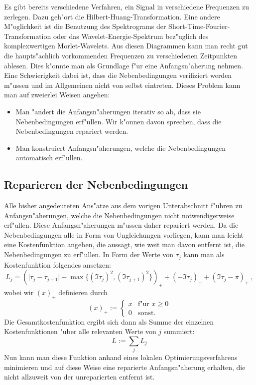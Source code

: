\documentclass[a4paper]{scrartcl}
\begin{document}
Es gibt bereits verschiedene Verfahren, ein Signal in verschiedene Frequenzen zu zerlegen. 
Dazu geh"ort die Hilbert-Huang-Transformation. 
Eine andere M"oglichkeit ist die Benutzung des Spektrograms der Short-Time-Fourier-Transformation oder das Wavelet-Energie-Spektrum bez"uglich des komplexwertigen Morlet-Wavelets. 
Aus diesen Diagrammen kann man recht gut die haupts"achlich vorkommenden Frequenzen zu verschiedenen Zeitpunkten ablesen. 
Dies k"onnte man als Grundlage f"ur eine Anfangsn"aherung nehmen. 
Eine Schwierigkeit dabei ist, dass die Nebenbedingungen verifiziert werden m"ussen und im Allgemeinen nicht von selbst eintreten. 
Dieses Problem kann man auf zweierlei Weisen angehen:
\begin{itemize}
  \item Man "andert die Anfangsn"aherungen iterativ so ab, dass sie Nebenbedingungen erf"ullen. 
  Wir k"onnen davon sprechen, dass die Nebenbedingungen repariert werden. 
  \item Man konstruiert Anfangsn"aherungen, welche die Nebenbedingungen automatisch erf"ullen. 
\end{itemize}


\subsection{Reparieren der Nebenbedingungen}

Alle bisher angedeuteten Ans"atze aus dem vorigen Unterabschnitt f"uhren zu Anfangsn"aherungen, welche die Nebenbedingungen nicht notwendigerweise erf"ullen. 
Diese An\-fangs\-n"a\-he\-rungen m"ussen daher repariert werden. 
Da die Nebenbedingungen alle in Form von Ungleichungen vorliegen, kann man leicht eine Kostenfunktion angeben, die aussagt, wie weit man davon entfernt ist, die Nebenbedingungen zu erf"ullen. 
In Form der Werte von $\tau_j$ kann man als Kostenfunktion folgendes ansetzen:
$$ L_j = \left(\lvert\tau_j-\tau_{j+1}\rvert - \max\{(\Im\tau_j)^2, (\Im\tau_{j+1})^2\}\right)_+ + (-\Im\tau_j)_+ + (\Im\tau_j-\pi)_+\,, $$
wobei wir $(x)_+$ definieren durch
$$ (x)_+ := \begin{cases} x & \text{f"ur $x\ge0$} \\ 0 & \text{sonst.}\end{cases} $$
Die Gesamtkostenfunktion ergibt sich dann als Summe der einzelnen Kostenfunktionen "uber alle relevanten Werte von $j$ summiert:
$$ L := \sum_j L_j $$
Nun kann man diese Funktion anhand eines lokalen Optimierungsverfahrens minimieren und auf diese Weise eine reparierte Anfangsn"aherung erhalten, die nicht allzuweit von der unreparierten entfernt ist. 
\end{document}
